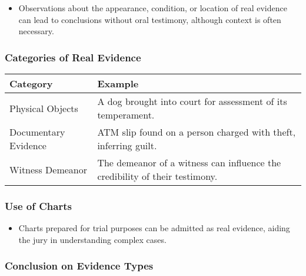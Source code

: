 \begin{itemize}
\tightlist
\item
  Observations about the appearance, condition, or location of real
  evidence can lead to conclusions without oral testimony, although
  context is often necessary.
\end{itemize}

\subsubsection{Categories of Real
Evidence}\label{categories-of-real-evidence}

\begin{longtable}[]{@{}
  >{\raggedright\arraybackslash}p{}
  >{\raggedright\arraybackslash}p{}@{}}
\toprule\noalign{}
\begin{minipage}[b]{\linewidth}\raggedright
Category
\end{minipage} & \begin{minipage}[b]{\linewidth}\raggedright
Example
\end{minipage} \\
\midrule\noalign{}
\endhead
\bottomrule\noalign{}
\endlastfoot
Physical Objects & A dog brought into court for assessment of its
temperament. \\
Documentary Evidence & ATM slip found on a person charged with theft,
inferring guilt. \\
Witness Demeanor & The demeanor of a witness can influence the
credibility of their testimony. \\
\end{longtable}

\subsubsection{Use of Charts}\label{use-of-charts}

\begin{itemize}
\tightlist
\item
  Charts prepared for trial purposes can be admitted as real evidence,
  aiding the jury in understanding complex cases.
\end{itemize}

\subsubsection{Conclusion on Evidence
Types}\label{conclusion-on-evidence-types}

